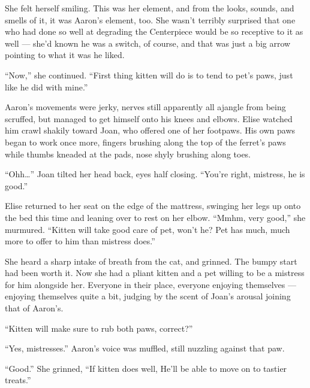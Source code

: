 She felt herself smiling. This was her element, and from the looks, sounds, and smells of it, it was Aaron's element, too. She wasn't terribly surprised that one who had done so well at degrading the Centerpiece would be so receptive to it as well --- she'd known he was a switch, of course, and that was just a big arrow pointing to what it was he liked.

``Now,'' she continued. ``First thing kitten will do is to tend to pet's paws, just like he did with mine.''

Aaron's movements were jerky, nerves still apparently all ajangle from being scruffed, but managed to get himself onto his knees and elbows. Elise watched him crawl shakily toward Joan, who offered one of her footpaws. His own paws began to work once more, fingers brushing along the top of the ferret's paws while thumbs kneaded at the pads, nose shyly brushing along toes.

``Ohh\ldots{}'' Joan tilted her head back, eyes half closing. ``You're right, mistress, he is good.''

Elise returned to her seat on the edge of the mattress, swinging her legs up onto the bed this time and leaning over to rest on her elbow. ``Mmhm, very good,'' she murmured. ``Kitten will take good care of pet, won't he? Pet has much, much more to offer to him than mistress does.''

She heard a sharp intake of breath from the cat, and grinned. The bumpy start had been worth it. Now she had a pliant kitten and a pet willing to be a mistress for him alongside her. Everyone in their place, everyone enjoying themselves --- enjoying themselves quite a bit, judging by the scent of Joan's arousal joining that of Aaron's.

``Kitten will make sure to rub both paws, correct?''

``Yes, mistresses.'' Aaron's voice was muffled, still nuzzling against that paw.

``Good.'' She grinned, ``If kitten does well, He'll be able to move on to tastier treats.''
